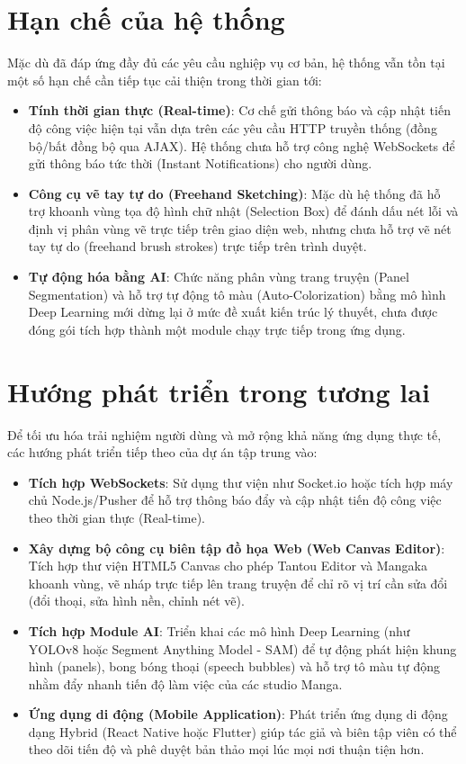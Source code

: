 \section{Hạn chế của hệ thống}
\label{sec:conclusion_limitations}
Mặc dù đã đáp ứng đầy đủ các yêu cầu nghiệp vụ cơ bản, hệ thống vẫn tồn tại một số hạn chế cần tiếp tục cải thiện trong thời gian tới:
\begin{itemize}
    \item \textbf{Tính thời gian thực (Real-time)}: Cơ chế gửi thông báo và cập nhật tiến độ công việc hiện tại vẫn dựa trên các yêu cầu HTTP truyền thống (đồng bộ/bất đồng bộ qua AJAX). Hệ thống chưa hỗ trợ công nghệ WebSockets để gửi thông báo tức thời (Instant Notifications) cho người dùng.
    \item \textbf{Công cụ vẽ tay tự do (Freehand Sketching)}: Mặc dù hệ thống đã hỗ trợ khoanh vùng tọa độ hình chữ nhật (Selection Box) để đánh dấu nét lỗi và định vị phân vùng vẽ trực tiếp trên giao diện web, nhưng chưa hỗ trợ vẽ nét tay tự do (freehand brush strokes) trực tiếp trên trình duyệt.
    \item \textbf{Tự động hóa bằng AI}: Chức năng phân vùng trang truyện (Panel Segmentation) và hỗ trợ tự động tô màu (Auto-Colorization) bằng mô hình Deep Learning mới dừng lại ở mức đề xuất kiến trúc lý thuyết, chưa được đóng gói tích hợp thành một module chạy trực tiếp trong ứng dụng.
\end{itemize}

\section{Hướng phát triển trong tương lai}
\label{sec:conclusion_future_work}
Để tối ưu hóa trải nghiệm người dùng và mở rộng khả năng ứng dụng thực tế, các hướng phát triển tiếp theo của dự án tập trung vào:
\begin{itemize}
    \item \textbf{Tích hợp WebSockets}: Sử dụng thư viện như Socket.io hoặc tích hợp máy chủ Node.js/Pusher để hỗ trợ thông báo đẩy và cập nhật tiến độ công việc theo thời gian thực (Real-time).
    \item \textbf{Xây dựng bộ công cụ biên tập đồ họa Web (Web Canvas Editor)}: Tích hợp thư viện HTML5 Canvas cho phép Tantou Editor và Mangaka khoanh vùng, vẽ nháp trực tiếp lên trang truyện để chỉ rõ vị trí cần sửa đổi (đổi thoại, sửa hình nền, chỉnh nét vẽ).
    \item \textbf{Tích hợp Module AI}: Triển khai các mô hình Deep Learning (như YOLOv8 hoặc Segment Anything Model - SAM) để tự động phát hiện khung hình (panels), bong bóng thoại (speech bubbles) và hỗ trợ tô màu tự động nhằm đẩy nhanh tiến độ làm việc của các studio Manga.
    \item \textbf{Ứng dụng di động (Mobile Application)}: Phát triển ứng dụng di động dạng Hybrid (React Native hoặc Flutter) giúp tác giả và biên tập viên có thể theo dõi tiến độ và phê duyệt bản thảo mọi lúc mọi nơi thuận tiện hơn.
\end{itemize}
